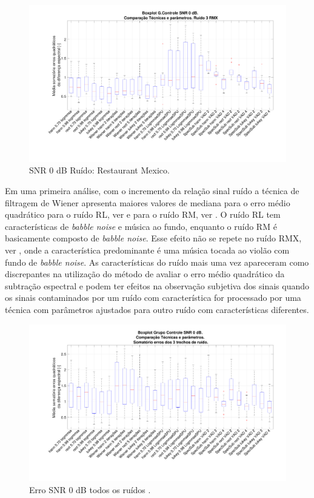 \begin{figure}[H]
\centering
\includegraphics[width=16cm]{Figs/Erro_0_Ruido3.pdf}
\caption{SNR 0 dB Ruído: Restaurant Mexico.}
\label{snr0_3}
\end{figure}

Em uma primeira análise, com o incremento da relação sinal ruído a técnica de filtragem de Wiener apresenta maiores valores de mediana para o erro médio quadrático para o ruído RL, ver  e para o ruído RM, ver . O ruído RL tem características de \textit{babble noise} e música ao fundo, enquanto o ruído RM é basicamente composto de \textit{babble noise}. Esse efeito não se repete no ruído RMX, ver , onde a característica predominante é uma música tocada ao violão com fundo de \textit{babble noise}. As características do ruído mais uma vez apareceram como discrepantes na utilização do método de avaliar o erro médio quadrático da subtração espectral e podem ter efeitos na observação subjetiva dos sinais quando os sinais contaminados por um ruído com característica for processado por uma técnica com parâmetros ajustados para outro ruído com características diferentes.  

\begin{figure}[H]
\centering
\includegraphics[width=16cm]{Figs/Erro_0_Ruidos.pdf}
\caption{Erro SNR 0 dB todos os ruídos .}
\label{snr0_3r}
\end{figure}

